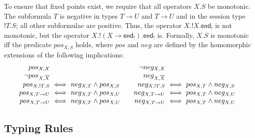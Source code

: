 \documentclass[orivec,envcountsame]{llncs}
\makeatletter
\newcommand{\gvdual}[1]{\overline{#1}}
\newcommand{\gvout}[2]{{!#1.#2}}
\newcommand{\lto}{\ensuremath{\multimap}}
\newcommand{\uto}{\ensuremath{\rightarrow}}
\newcommand{\outterm}{\mkwd{end}_!}
\newcommand{\mkwd}[1]{\mathsf{#1}}
\newcommand{\ba}{\begin{array}}
\newcommand{\ea}{\end{array}}
\newenvironment{eqs}{\ba{@{}r@{~}c@{~}l@{}}}{\ea}
\makeatother
\begin{document}
To ensure that fixed points exist, we require that all operators $X.S$ be monotonic.
The subformula $T$ is negative in types $T \lto U$ and $T \uto U$ and in the session type
$\gvout{T}{S}$; all other subformulae are positive.  Thus, the operator $X.\gvout{X}{\outterm}$ is
not monotonic, but the operator $X.\gvout{(X \uto \outterm)}{\outterm}$ is.
%
Formally, $X.S$ is monotonic iff the predicate $pos_{X,S}$ holds, where $pos$ and $neg$ are defined
by the homomorphic extensions of the following implications:
\small\[
\ba{@{}c@{\qquad}c@{}}
\begin{eqs}
pos_{X,X} \\
\neg pos_{X,\gvdual{X}} \\
pos_{X,\gvout{T}{S}} &\iff& neg_{X,T} \wedge pos_{X,S} \\
pos_{X,T \lto U} &\iff& neg_{X,T} \wedge pos_{X,U} \\
pos_{X,T \uto U} &\iff& neg_{X,T} \wedge pos_{X,U} \\
\end{eqs}
&
\begin{eqs}
\neg neg_{X,X} \\
neg_{X,\gvdual{X}} \\
neg_{X,\gvout{T}{S}} &\iff& pos_{X,T} \wedge neg_{X,S} \\
neg_{X,T \lto U} &\iff& pos_{X,T} \wedge neg_{X,U} \\
neg_{X,T \uto U} &\iff& pos_{X,T} \wedge neg_{X,U} \\
\end{eqs}
\ea
\]\normalsize

\subsection{Typing Rules}
\label{sec:mugv-typing}
\end{document}
